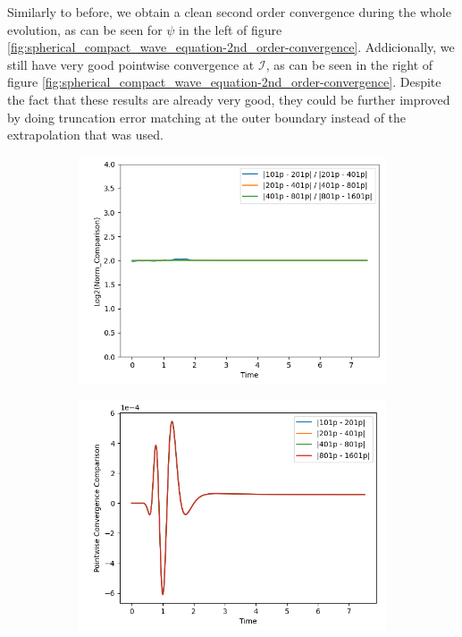 Similarly to before, we obtain a clean second order convergence during the whole evolution, as can be seen for $\psi$ in the left of figure \ref{fig:spherical_compact_wave_equation-2nd_order-convergence}. Addicionally, we still have very good pointwise convergence at $\mathscr{I}$, as can be seen in the right of figure \ref{fig:spherical_compact_wave_equation-2nd_order-convergence}. Despite the fact that these results are already very good, they could be further improved by doing truncation error matching at the outer boundary instead of the extrapolation that was used.

\begin{figure}[h]
    \centering
    \begin{subfigure}[b]{0.45\textwidth}
        \centering
        \includegraphics[width=\textwidth]{Images/Wave_Equation_3+1_Spherical-Norm.png}
    \end{subfigure}
    \hfill
    \begin{subfigure}[b]{0.45\textwidth}
        \centering
        \includegraphics[width=\textwidth]{Images/Wave_Equation_3+1_Spherical-Pointwise.png}

\end{subfigure}
\end{figure}
